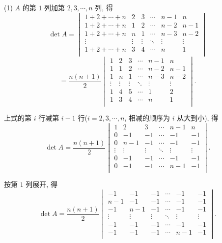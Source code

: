 \documentclass[color=black,device=normal,lang=cn,mode=geye]{elegantnote}
\begin{document}
\begin{solution}
    (1) $A$ 的第 $1$ 列加第 $2,3,\cdots,n$ 列, 得
    \[\det A=\begin{vmatrix}
        1+2+\cdots+n & 2 & 3 & \cdots & {n-1} & n \\
        1+2+\cdots+n & 1 & 2 & \cdots & {n-2} & {n-1} \\
        1+2+\cdots+n & n & 1 & \cdots & {n-3} & {n-2} \\
        \vdots & \vdots & \vdots & \ddots & \vdots & \vdots \\
        1+2+\cdots+n & 3 & 4 & \cdots & n & 1 \\
    \end{vmatrix}\]
    \[=\dfrac{n(n+1)}{2}\begin{vmatrix}
        1 & 2 & 3 & \cdots & {n-1} & n \\
        1 & 1 & 2 & \cdots & {n-2} & {n-1} \\
        1 & n & 1 & \cdots & {n-3} & {n-2} \\
        \vdots & \vdots & \vdots & \ddots & \vdots & \vdots \\
        1 & 4 & 5 & \cdots & 1 & 2 \\
        1 & 3 & 4 & \cdots & n & 1 \\
    \end{vmatrix}.\]

    上式的第 $i$ 行减第 $i-1$ 行($i=2,3,\cdots,n$, 相减的顺序为 $i$ 从大到小), 得
    \[\det A=\dfrac{n(n+1)}{2}\begin{vmatrix}
        1 & 2 & 3 & \cdots & {n-1} & n \\
        0 & -1 & -1 & \cdots & -1 & -1 \\
        0 & n-1 & -1 & \cdots & -1 & -1 \\
        \vdots & \vdots & \vdots & \ddots & \vdots & \vdots \\
        0 & -1 & -1 & \cdots & -1 & -1 \\
        0 & -1 & -1 & \cdots & n-1 & -1 \\
    \end{vmatrix}.\]

    按第 $1$ 列展开, 得
    \[\det A=\dfrac{n(n+1)}{2}\begin{vmatrix}
        -1 & -1 & -1 & \cdots & -1 & -1 \\
        n-1 & -1 & -1 & \cdots & -1 & -1 \\
        -1 & n-1 & -1 & \cdots & -1 & -1 \\
        \vdots & \vdots & \vdots & \ddots &\vdots & \vdots \\
        -1 & -1 & -1 & \cdots & -1 & -1 \\
        -1 & -1 & -1 & \cdots & n-1 & -1 \\
    \end{vmatrix}.\]


\end{solution}
\end{document}
